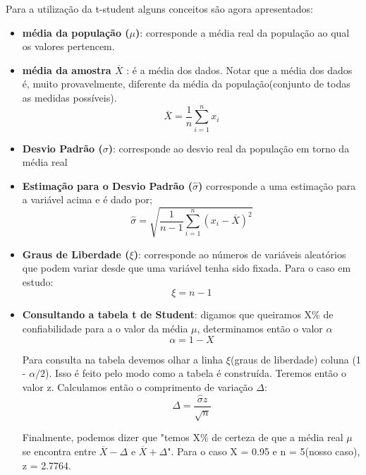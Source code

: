Para a utilização da t-student alguns conceitos são agora apresentados:
\begin{itemize}
\item \textbf{média da população ($\mu$)}: corresponde a média real da população ao qual os valores pertencem.

\item \textbf{média da amostra $\overline{X}$} : é a média dos dados. Notar que a média dos dados é, muito provavelmente, diferente
da média da população(conjunto de todas as medidas possíveis).
\begin{equation}
		\overline{X} = \frac{1}{n}\sum_{i=1}^{n} x_i
\end{equation}

\item \textbf{Desvio Padrão ($\sigma$)}: corresponde ao desvio real da população em torno da média real

\item \textbf{Estimação para o Desvio Padrão ($\widehat{\sigma}$)} corresponde a uma estimação para a variável acima
e é dado por;
	\begin{equation}
		\widehat{\sigma} = \sqrt{\frac{1}{n-1}\sum_{i=1}^{n} (x_i - \overline{X})^2}
	\end{equation}
\item  \textbf{Graus de Liberdade ($\xi$)}: corresponde ao números de variáveis aleatórios que podem variar desde que uma variável tenha
sido fixada. Para o caso em estudo:
\begin{equation}
	\xi = n-1
\end{equation}

\item \textbf{Consultando a tabela t de Student}: digamos que queiramos X\% de confiabilidade para a o valor da média $\mu$, determinamos então o valor $\alpha$
\begin{equation}
	\alpha = 1 - X
\end{equation}

Para consulta na tabela devemos olhar a linha $\xi$(graus de liberdade) coluna (1 - $\alpha/2$). Isso é feito pelo modo como
a tabela é construída. Teremos então o valor z. Calculamos então o comprimento de variação $\Delta$:
\begin{equation}
	\Delta = \frac{\widehat{\sigma}z}{\sqrt{n}}
\end{equation}

Finalmente, podemos dizer que "temos X\% de certeza de que a média real $\mu$ se encontra entre $\overline{X} - \Delta$ e $\overline{X} + \Delta$".
Para o caso X = 0.95 e n = 5(nosso caso), z = 2.7764.
\end{itemize}



